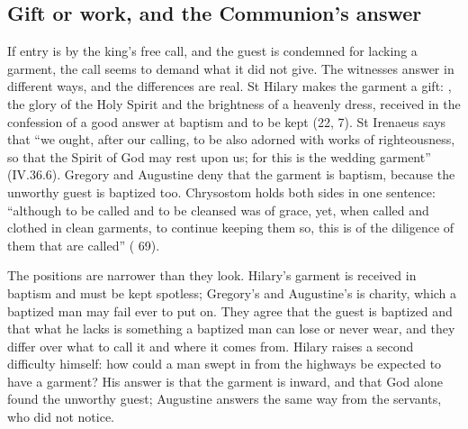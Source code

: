 \subsection{Gift or work, and the Communion's answer}

If entry is by the king's free call, and the guest is condemned for lacking a
garment, the call seems to demand what it did not give. The witnesses answer in
different ways, and the differences are real. St Hilary makes the garment a
gift: , the glory of the Holy Spirit and the brightness of a
heavenly dress, received in the confession of a good answer at baptism and to be
kept  (22, 7). St
Irenaeus says that ``we ought, after our calling, to be also adorned with works
of righteousness, so that the Spirit of God may rest upon us; for this is the
wedding garment'' (IV.36.6). Gregory and Augustine deny that the garment is
baptism, because the unworthy guest is baptized too. Chrysostom holds both sides
in one sentence: ``although to be called and to be cleansed was of grace, yet,
when called and clothed in clean garments, to continue keeping them so, this is
of the diligence of them that are called'' ( 69).

The positions are narrower than they look. Hilary's garment is received in
baptism and must be kept spotless; Gregory's and Augustine's is charity, which a
baptized man may fail ever to put on. They agree that the guest is baptized and
that what he lacks is something a baptized man can lose or never wear, and they
differ over what to call it and where it comes from. Hilary raises a second
difficulty himself: how could a man swept in from the highways be expected to
have a garment? His answer is that the garment is inward, and that God alone
found the unworthy guest; Augustine answers the same way from the servants, who
did not notice.

